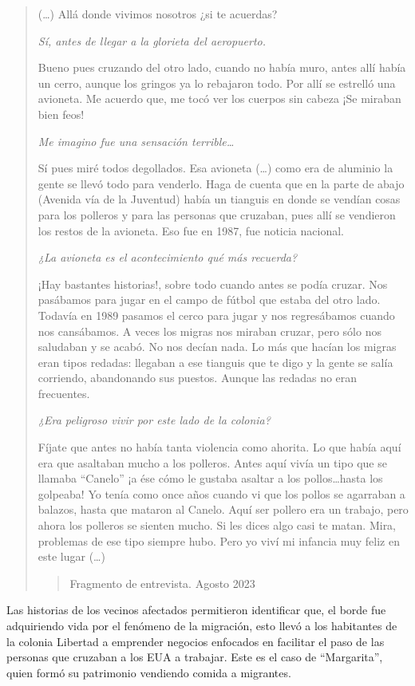 \documentclass[
  spanish,
  11pt,
  a4paper,
]{scrbook}
\begin{document}
\begin{quote}
(\ldots) Allá donde vivimos nosotros ¿si te acuerdas?

\emph{Sí, antes de llegar a la glorieta del aeropuerto.}

Bueno pues cruzando del otro lado, cuando no había muro, antes allí
había un cerro, aunque los gringos ya lo rebajaron todo. Por allí se
estrelló una avioneta. Me acuerdo que, me tocó ver los cuerpos sin
cabeza ¡Se miraban bien feos!

\emph{Me imagino fue una sensación terrible\ldots{}}

Sí pues miré todos degollados. Esa avioneta (\ldots) como era de
aluminio la gente se llevó todo para venderlo. Haga de cuenta que en la
parte de abajo (Avenida vía de la Juventud) había un tianguis en donde
se vendían cosas para los polleros y para las personas que cruzaban,
pues allí se vendieron los restos de la avioneta. Eso fue en 1987, fue
noticia nacional.

\emph{¿La avioneta es el acontecimiento qué más recuerda?}

¡Hay bastantes historias!, sobre todo cuando antes se podía cruzar. Nos
pasábamos para jugar en el campo de fútbol que estaba del otro lado.
Todavía en 1989 pasamos el cerco para jugar y nos regresábamos cuando
nos cansábamos. A veces los migras nos miraban cruzar, pero sólo nos
saludaban y se acabó. No nos decían nada. Lo más que hacían los migras
eran tipos redadas: llegaban a ese tianguis que te digo y la gente se
salía corriendo, abandonando sus puestos. Aunque las redadas no eran
frecuentes.

\emph{¿Era peligroso vivir por este lado de la colonia?}

Fíjate que antes no había tanta violencia como ahorita. Lo que había
aquí era que asaltaban mucho a los polleros. Antes aquí vivía un tipo
que se llamaba ``Canelo'' ¡a ése cómo le gustaba asaltar a los
pollos\ldots hasta los golpeaba! Yo tenía como once años cuando vi que
los pollos se agarraban a balazos, hasta que mataron al Canelo. Aquí ser
pollero era un trabajo, pero ahora los polleros se sienten mucho. Si les
dices algo casi te matan. Mira, problemas de ese tipo siempre hubo. Pero
yo viví mi infancia muy feliz en este lugar (\ldots)

\begin{quote}
Fragmento de entrevista. Agosto 2023
\end{quote}
\end{quote}

Las historias de los vecinos afectados permitieron identificar que, el
borde fue adquiriendo vida por el fenómeno de la migración, esto llevó a
los habitantes de la colonia Libertad a emprender negocios enfocados en
facilitar el paso de las personas que cruzaban a los EUA a trabajar.
Este es el caso de ``Margarita'', quien formó su patrimonio vendiendo
comida a migrantes.
\end{document}
